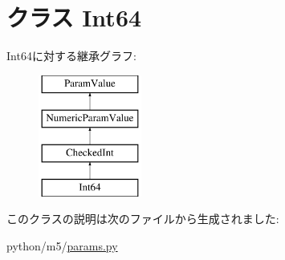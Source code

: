 \hypertarget{classm5_1_1params_1_1Int64}{
\section{クラス Int64}
\label{classm5_1_1params_1_1Int64}
}
Int64に対する継承グラフ:\begin{figure}[H]
\begin{center}
\leavevmode
\includegraphics[height=4cm]{classm5_1_1params_1_1Int64}
\end{center}
\end{figure}


このクラスの説明は次のファイルから生成されました:\begin{DoxyCompactItemize}
\item 
python/m5/\hyperlink{params_8py}{params.py}\end{DoxyCompactItemize}
